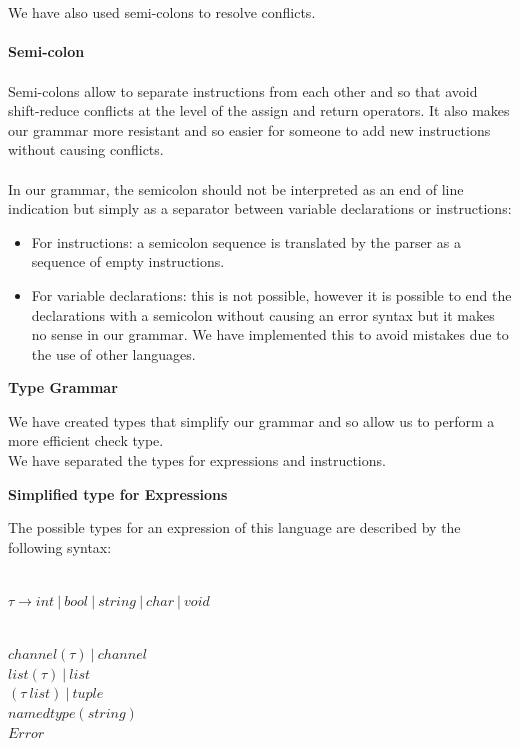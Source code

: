 \documentclass[11pt]{report}
\begin{document}
\\ \\
\newpage
We have also used semi-colons to resolve conflicts. \\ \\
\tabto{2cm} \textbf{Semi-colon} \\ \\
\tabto{1cm}Semi-colons allow to separate instructions from each other and so that avoid shift-reduce conflicts at the level of the assign and return operators. It also makes our grammar more resistant and so easier for someone to add new instructions without causing conflicts. \\ \\
\tabto{1cm} In our grammar, the semicolon should not be interpreted as an end of line indication but simply as a separator between variable declarations or instructions:
\begin{itemize}
\item For instructions: a semicolon sequence is translated by the parser as a sequence of empty instructions.
\item For variable declarations: this is not possible, however it is possible to end the declarations with a semicolon without causing an error syntax but it makes no sense in our grammar. We have implemented this to avoid mistakes due to the use of other languages.
\end{itemize}

\newpage
\centerline{\textbf{\Huge Type Grammar}}
\vspace*{3pt}
\vspace*{20pt}
We have created types that simplify our grammar and so allow us to perform a more efficient check type. \\ We have separated the types for expressions and instructions.

\tabto{0cm} {\Large \textbf{Simplified type for Expressions}}

\tabto{0cm}The possible types for an expression of this language are described by the following syntax:
\\ \\
\centerline{$\tau \rightarrow int \ | \ bool \ | \ string \ | \ char \ | \ void$} \\
$ channel( \tau) \ | \ channel $ \\
$ list(\tau) \ | \ list $ \\
$ ( \tau \ list) \ | \ tuple $ \\
$ namedtype(string)$ \\
$ Error $
\end{document}
